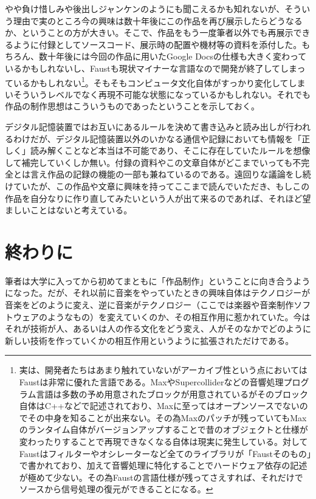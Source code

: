 \documentclass[a4paper,report]{jsbook}
\begin{document}
やや負け惜しみや後出しジャンケンのようにも聞こえるかも知れないが、そういう理由で実のところ今の興味は数十年後にこの作品を再び展示したらどうなるか、ということの方が大きい。そこで、作品をもう一度筆者以外でも再展示できるように付録としてソースコード、展示時の配置や機材等の資料を添付した。もちろん、数十年後には今回の作品に用いたGoogle
Docsの仕様も大きく変わっているかもしれないし、Faustも現状マイナーな言語なので開発が終了してしまっているかもしれない\footnote{実は、開発者たちはあまり触れていないがアーカイブ性という点においてはFaustは非常に優れた言語である。MaxやSupercolliderなどの音響処理プログラム言語は多数の予め用意されたブロックが用意されているがそのブロック自体はC++などで記述されており、Maxに至ってはオープンソースでないのでその中身を知ることが出来ない。その為Maxのパッチが残っていてもMaxのランタイム自体がバージョンアップすることで昔のオブジェクトと仕様が変わったりすることで再現できなくなる自体は現実に発生している。対してFaustはフィルターやオシレーターなど全てのライブラリが「Faustそのもの」で書かれており、加えて音響処理に特化することでハードウェア依存の記述が極めて少ない。その為Faustの言語仕様が残ってさえすれば、それだけでソースから信号処理の復元ができることになる。}。そもそもコンピュータ文化自体がすっかり変化してしまいそういうレベルでなく再現不可能な状態になっているかもしれない。それでも作品の制作思想はこういうものであったということを示しておく。

デジタル記憶装置ではお互いにあるルールを決めて書き込みと読み出しが行われるわけだが、デジタル記憶装置以外のいかなる通信や記録においても情報を「正しく」読み解くことなど本当は不可能であり、そこに存在していたルールを想像して補完していくしか無い。付録の資料やこの文章自体がどこまでいっても不完全とは言え作品の記録の機能の一部も兼ねているのである。遠回りな議論をし続けていたが、この作品や文章に興味を持ってここまで読んでいただき、もしこの作品を自分なりに作り直してみたいという人が出て来るのであれば、それほど望ましいことはないと考えている。

\section{終わりに}\label{ux7d42ux308fux308aux306b}

筆者は大学に入ってから初めてまともに「作品制作」ということに向き合うようになった。だが、それ以前に音楽をやっていたときの興味自体はテクノロジーが音楽をどのように変え、逆に音楽がテクノロジー（ここでは楽器や音楽制作ソフトウェアのようなもの）を変えていくのか、その相互作用に惹かれていた。今はそれが技術が人、あるいは人の作る文化をどう変え、人がそのなかでどのように新しい技術を作っていくかの相互作用というように拡張されただけである。
\end{document}
